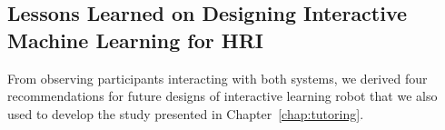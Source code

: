 

\subsection{Lessons Learned on Designing Interactive Machine Learning for HRI}

From observing participants interacting with both systems, we derived four recommendations for future designs of interactive learning robot that we also used to develop the study presented in Chapter~\ref{chap:tutoring}. 

